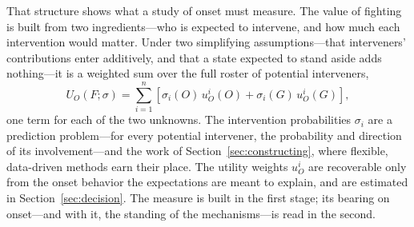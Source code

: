 That structure shows what a study of onset must measure.  The value of fighting
is built from two ingredients---who is expected to intervene, and how much each
intervention would matter.  Under two simplifying assumptions---that
interveners' contributions enter additively, and that a state expected to stand
aside adds nothing---it is a weighted sum over the full roster of potential
interveners,
\begin{equation}
U_O(F; \sigma) = \sum_{i=1}^{n} \left[\sigma_i(O)\, u_O^i(O) + \sigma_i(G)\, u_O^i(G)\right],
\label{eq:EU}
\end{equation}
one term for each of the two unknowns.  The intervention probabilities
$\sigma_i$ are a prediction problem---for every potential intervener, the
probability and direction of its involvement---and the work of
Section~\ref{sec:constructing}, where flexible, data-driven methods earn their
place.  The utility weights $u_O^i$ are recoverable only from the onset
behavior the expectations are meant to explain, and are estimated in
Section~\ref{sec:decision}.  The measure is built in the first stage; its
bearing on onset---and with it, the standing of the mechanisms---is read in
the second.
